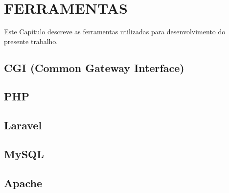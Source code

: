 
\chapter{FERRAMENTAS}
Este Capítulo descreve as ferramentas utilizadas para desenvolvimento do presente trabalho.


\section{CGI (Common Gateway Interface)}


\section{PHP}


\section{Laravel}


\section{MySQL}
%

\section{Apache}
